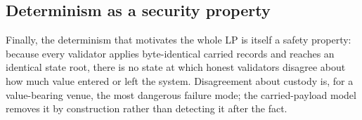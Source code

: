 \subsection{Determinism as a security property}

Finally, the determinism that motivates the whole LP is itself a safety
property: because every validator applies byte-identical carried records
and reaches an identical state root, there is no state at which honest
validators disagree about how much value entered or left the system.
Disagreement about custody is, for a value-bearing venue, the most
dangerous failure mode; the carried-payload model removes it by
construction rather than detecting it after the fact.
